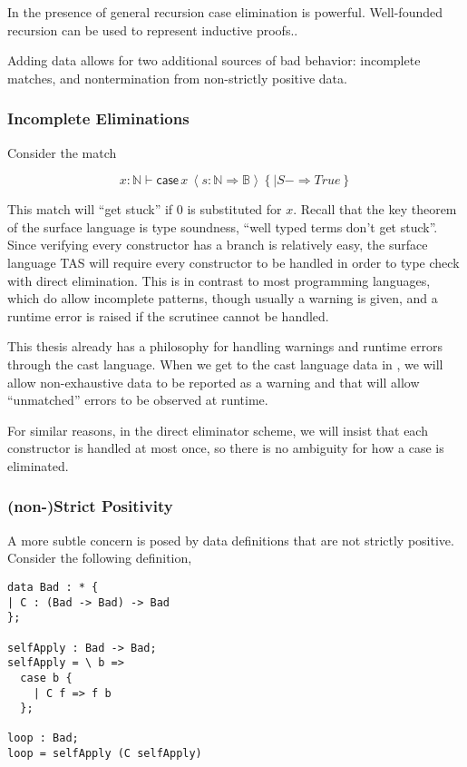In the presence of general recursion case elimination is powerful.
Well-founded recursion can be used to represent inductive proofs..

Adding data allows for two additional sources of bad behavior: incomplete matches, and nontermination from non-strictly positive data. 

\subsubsection{Incomplete Eliminations}

Consider the match 

\[
x:\mathbb{N}\vdash\mathsf{case}\,x\,\left\langle s:\mathbb{N}\Rightarrow\mathbb{B}\right\rangle \left\{ |S-\Rightarrow True\right\} 
\]

This match will ``get stuck'' if $0$ is substituted for $x$.
Recall that the key theorem of the surface language is type soundness, ``well typed terms don't get stuck''.
Since verifying every constructor has a branch is relatively easy, the surface language \ac{TAS} will require every constructor to be handled in order to type check with direct elimination.
This is in contrast to most programming languages, which do allow incomplete patterns, though usually a warning is given, and a runtime error is raised if the scrutinee cannot be handled.


This thesis already has a philosophy for handling warnings and runtime errors through the cast language.
When we get to the cast language data in , we will allow non-exhaustive data to be reported as a warning and that will allow ``unmatched'' errors to be observed at runtime.

For similar reasons, in the direct eliminator scheme, we will insist that each constructor is handled at most once, so there is no ambiguity for how a case is eliminated.

\subsubsection{(non-)Strict Positivity}

A more subtle concern is posed by data definitions that are not strictly positive.
Consider the following definition, 

\begin{lstlisting}[basicstyle={\ttfamily\small}]
data Bad : * {
| C : (Bad -> Bad) -> Bad
};

selfApply : Bad -> Bad;
selfApply = \ b =>
  case b {
    | C f => f b
  };

loop : Bad;
loop = selfApply (C selfApply)
\end{lstlisting}

